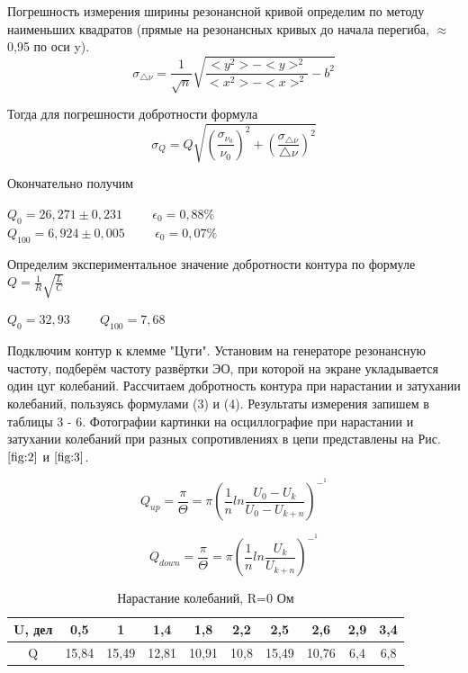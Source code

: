 \documentclass[a4paper, fontsize = 14pt]{article}
\begin{document}
Погрешность измерения ширины резонансной кривой определим по методу наименьших квадратов (прямые на резонансных кривых до начала перегиба, $\approx$ 0,95 по оси y). 
$$\sigma_{\triangle \nu} = \frac{1}{\sqrt{n}} \sqrt{\frac{<y^2>-<y>^2}{<x^2>-<x>^2} - b^2}$$

Тогда для погрешности добротности формула
$$\sigma_Q = Q\sqrt{(\frac{\sigma_{\nu_0}}{\nu_0})^2 + (\frac{\sigma_{\triangle \nu}}{\triangle \nu})^2}$$

Окончательно получим

\begin{center}
$Q_0 =  26,271 \pm 0,231 \hspace{1cm} \epsilon_0 = 0,88\% $\\
$Q_{100} =  6,924 \pm 0,005 \hspace{1cm} \epsilon_0 = 0,07\% $

\end{center}
Определим экспериментальное значение добротности контура по формуле $Q = \frac{1}{R}\sqrt{\frac{L}{C}}$

\begin{center}
    $Q_0 = 32,93 \hspace{1cm} Q_{100} = 7,68$
\end{center}

 Подключим контур к клемме "Цуги". Установим на генераторе резонансную частоту, подберём частоту развёртки ЭО, при которой на экране укладывается один цуг колебаний. Рассчитаем добротность контура при нарастании и затухании колебаний, пользуясь формулами (3) и (4). Результаты измерения запишем в таблицы 3 - 6. Фотографии картинки на осциллографие при нарастании и затухании колебаний при разных сопротивлениях в цепи представлены на Рис. $\ref{fig:2}$ и $\ref{fig:3}$.
    
    $$ Q_{up} = \frac{\pi}{\Theta} =  \pi (\frac{1}{n} ln \frac{U_0 - U_k}{U_0 - U_{k+n}})^-^1 $$

$$ Q_{down} = \frac{\pi}{\Theta} = \pi (\frac{1}{n} ln \frac{U_k}{U_{k+n}})^-^1 $$
\begin{table}[h!]
\centering
\begin{tabular}{|c|c|c|c|c|c|c|c|c|c|}
\hline
U, дел & 0,5   & 1     & 1,4   & 1,8   & 2,2  & 2,5   & 2,6   & 2,9 & 3,4 \\ \hline
Q      & 15,84 & 15,49 & 12,81 & 10,91 & 10,8 & 15,49 & 10,76 & 6,4 & 6,8 \\ \hline
\end{tabular}
\caption{Нарастание колебаний, R=0 Ом}
\end{table}
\end{document}
